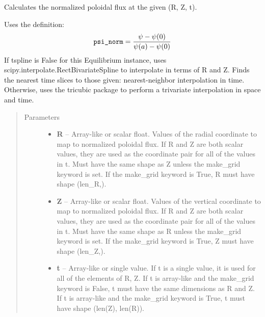 \documentclass[letterpaper,10pt,english]{sphinxmanual}
\begin{document}
\begin{fulllineitems}

\begin{fulllineitems}
\label{eqtools:eqtools.core.Equilibrium.rz2psinorm}
Calculates the normalized poloidal flux at the given (R, Z, t).

Uses the definition:
\begin{gather}
\begin{split}\texttt{psi\_norm} = \frac{\psi - \psi(0)}{\psi(a) - \psi(0)}\end{split}\notag
\end{gather}
If tspline is False for this Equilibrium instance, uses
scipy.interpolate.RectBivariateSpline to interpolate in terms of R and
Z. Finds the nearest time slices to those given: nearest-neighbor
interpolation in time. Otherwise, uses the tricubic package to perform
a trivariate interpolation in space and time.
\begin{quote}\begin{description}
\item[{Parameters }] \leavevmode\begin{itemize}
\item {} 
\textbf{R} --
Array-like or scalar float.
Values of the radial coordinate to
map to normalized poloidal flux. If R and Z are both scalar
values, they are used as the coordinate pair for all of the
values in t. Must have the same shape as Z unless the make\_grid
keyword is set. If the make\_grid keyword is True, R must have
shape (len\_R,).

\item {} 
\textbf{Z} --
Array-like or scalar float.
Values of the vertical coordinate to
map to normalized poloidal flux. If R and Z are both scalar
values, they are used as the coordinate pair for all of the
values in t. Must have the same shape as R unless the make\_grid
keyword is set. If the make\_grid keyword is True, Z must have
shape (len\_Z,).

\item {} 
\textbf{t} --
Array-like or single value.
If t is a single value, it is used
for all of the elements of R, Z. If t is array-like and the
make\_grid keyword is False, t must have the same dimensions as
R and Z. If t is array-like and the make\_grid keyword is True,
t must have shape (len(Z), len(R)).


\end{itemize}
\end{description}
\end{quote}
\end{fulllineitems}
\end{fulllineitems}
\end{document}
